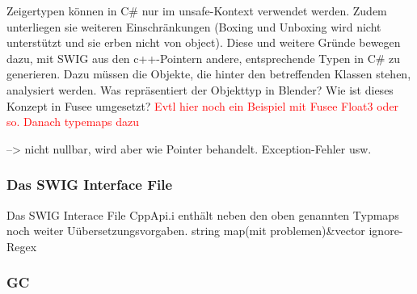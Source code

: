Zeigertypen können in C\# nur im unsafe-Kontext verwendet werden. Zudem unterliegen sie weiteren Einschränkungen (Boxing und Unboxing wird nicht unterstützt und sie erben nicht von object). Diese und weitere Gründe bewegen dazu, mit SWIG aus den c++-Pointern andere, entsprechende Typen in C\# zu generieren. Dazu müssen die Objekte, die hinter den betreffenden Klassen stehen, analysiert werden. Was repräsentiert der Objekttyp in Blender? Wie ist dieses Konzept in Fusee umgesetzt? \textcolor{red}{Evtl hier noch ein Beispiel mit Fusee Float3 oder so. Danach typemaps dazu}

--> nicht nullbar, wird aber wie Pointer behandelt. Exception-Fehler usw.

\subsubsection{Das SWIG Interface File}\label{subsubsec:Swiginterface}
Das SWIG Interace File CppApi.i enthält neben den oben genannten Typmaps noch weiter  Uübersetzungsvorgaben.
string
map(mit problemen)\&vector
ignore-Regex


\subsubsection{GC}\label{subsubsec:GC}
